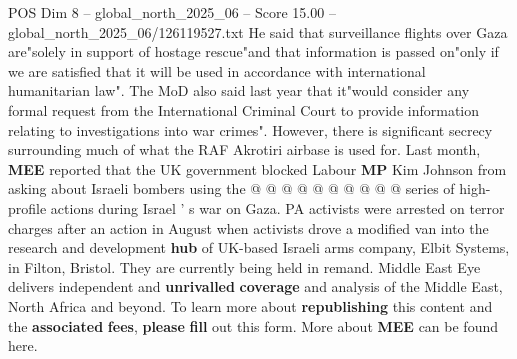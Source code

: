 \begin{textsample}{POS Dim 8 – global\_north\_2025\_06 – Score 15.00 – global\_north\_2025\_06/126119527.txt}
He said that surveillance flights over Gaza are"solely in support of hostage rescue"and that information is passed on"only if we are satisfied that it will be used in accordance with international humanitarian law".
The MoD also said last year that it"would consider any formal request from the International Criminal Court to provide information relating to investigations into war crimes".
However, there is significant secrecy surrounding much of what the RAF Akrotiri airbase is used for.
Last month, \textbf{MEE} reported that the UK government blocked Labour \textbf{MP} Kim Johnson from asking about Israeli bombers using the @ @ @ @ @ @ @ @ @ @ series of high-profile actions during Israel ' s war on Gaza.
PA activists were arrested on terror charges after an action in August when activists drove a modified van into the research and development \textbf{hub} of UK-based Israeli arms company, Elbit Systems, in Filton, Bristol.
They are currently being held in remand.
Middle East Eye delivers independent and \textbf{unrivalled} \textbf{coverage} and analysis of the Middle East, North Africa and beyond.
To learn more about \textbf{republishing} this content and the \textbf{associated} \textbf{fees}, \textbf{please} \textbf{fill} out this form.
More about \textbf{MEE} can be found here.

\end{textsample}
